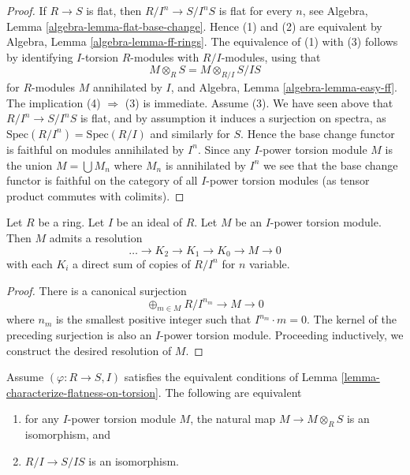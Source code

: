 \begin{proof}
If $R \to S$ is flat, then $R/I^n \to S/I^nS$ is flat for every $n$, see
Algebra, Lemma \ref{algebra-lemma-flat-base-change}.
Hence (1) and (2) are equivalent by
Algebra, Lemma \ref{algebra-lemma-ff-rings}.
The equivalence of (1) with (3) follows by identifying $I$-torsion
$R$-modules with $R/I$-modules, using that
$$
M \otimes_R S = M \otimes_{R/I} S/IS
$$ 
for $R$-modules $M$ annihilated by $I$, and
Algebra, Lemma \ref{algebra-lemma-easy-ff}.
The implication (4) $\Rightarrow$ (3) is immediate. Assume (3). We have
seen above that $R/I^n \to S/I^nS$ is flat, and by assumption it induces
a surjection on spectra, as $\text{Spec}(R/I^n) = \text{Spec}(R/I)$ and
similarly for $S$. Hence the base change functor is faithful on modules
annihilated by $I^n$. Since any $I$-power torsion module $M$ is the union
$M = \bigcup M_n$ where $M_n$ is annihilated by $I^n$ we see that the base
change functor is faithful on the category of all $I$-power torsion modules
(as tensor product commutes with colimits).
\end{proof}

\begin{lemma}
\label{lemma-I-power-torsion-presentation}
Let $R$ be a ring.
Let $I$ be an ideal of $R$.
Let $M$ be an $I$-power torsion module.
Then $M$ admits a resolution
$$
\ldots \to K_2 \to K_1 \to K_0 \to M \to 0
$$
with each $K_i$ a direct sum of copies of $R/I^n$ for $n$ variable.
\end{lemma}

\begin{proof}
There is a canonical surjection
$$
\oplus_{m \in M} R/I^{n_m} \to M \to 0
$$
where $n_m$ is the smallest positive integer such that $I^{n_m} \cdot m = 0$.
The kernel of the preceding surjection is also an $I$-power torsion module.
Proceeding inductively, we construct the desired resolution of $M$.
\end{proof}

\begin{lemma}
\label{lemma-neighbourhood-isomorphism}
Assume $(\varphi : R \to S, I)$ satisfies the equivalent conditions of
Lemma \ref{lemma-characterize-flatness-on-torsion}.
The following are equivalent
\begin{enumerate}
\item for any $I$-power torsion module $M$, the natural map
$M \to M \otimes_R S$ is an isomorphism, and
\item $R/I \to S/IS$ is an isomorphism.
\end{enumerate}
\end{lemma}


